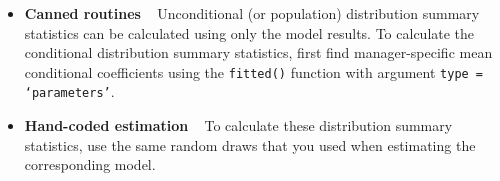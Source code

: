 \documentclass[11pt,letterpaper]{article}
\begin{document}
\begin{itemize}[label={}, leftmargin=*]
	\item \textbf{Canned routines} ~ Unconditional (or population) distribution summary statistics can be calculated using only the model results. To calculate the conditional distribution summary statistics, first find manager-specific mean conditional coefficients using the \texttt{fitted()} function with argument \texttt{type = `parameters'}.
	\item \textbf{Hand-coded estimation} ~ To calculate these distribution summary statistics, use the same random draws that you used when estimating the corresponding model.
\end{itemize}
\end{document}
